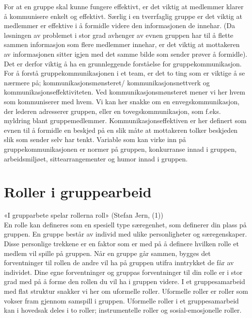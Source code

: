 %

For at en gruppe skal kunne fungere effektivt, er det viktig at medlemmer klarer å kommunisere enkelt og effektivt. Særlig i en tverrfaglig gruppe er det viktig at medlemmer er effektive i å formidle videre den informasjonen de innehar. (Da løsningen av problemet i stor grad avhenger av evnen gruppen har til å flette sammen informasjon som flere medlemmer innehar, er det viktig at mottakeren av informasjonen sitter igjen med det samme bilde som sender prøver å formidle). Det er derfor viktig å ha en grunnleggende forståelse for gruppekommunikasjon.\\

For å forstå gruppekommunikasjonen i et team, er det to ting som er viktige å se nærmere på; kommunikasjonsmønsteret/ kommunikasjonsnettverk og kommunikasjonseffektiviteten. Ved kommunikasjonsmønsteret mener vi her hvem som kommuniserer med hvem. Vi kan her snakke om en envegskommunikasjon, der lederen adresserer gruppen, eller en tovegskommunikasjon, som f.eks. myldring blant gruppemedlemmer. Kommunikasjonseffektiven er her definert som evnen til å formidle en beskjed på en slik måte at mottakeren tolker beskjeden slik som sender selv har tenkt.
Variable som kan virke inn på gruppekommunikasjonen er normer på gruppen, konkurranse innad i gruppen, arbeidsmiljøet, sittearrangementer og humor innad i gruppen.\\


\section{Roller i gruppearbeid}
«I grupparbete spelar rollerna roll» (Stefan Jern, (1))\\

En rolle kan defineres som en spesiell type særegenhet, som definerer din plass på gruppen. En gruppe består av individ med ulike personligheter og særegenskaper.  Disse personlige trekkene er en faktor som er med på å definere hvilken rolle et medlem vil spille på gruppen. Når en gruppe går sammen, bygges det forventninger til rollen de andre vil ha på gruppen utifra inntrykket de får av individet. Dine egne forventninger og gruppas forventninger til din rolle er i stor grad med på å forme den rollen du vil ha i gruppen videre. I et gruppesamarbeid med flat struktur snakker vi her om uformelle roller. Uformelle roller er roller som vokser fram gjennom samspill i gruppen. Uformelle roller i et gruppesamarbeid kan i hovedsak deles i to roller; instrumentelle roller og sosial-emosjonelle roller. \\

